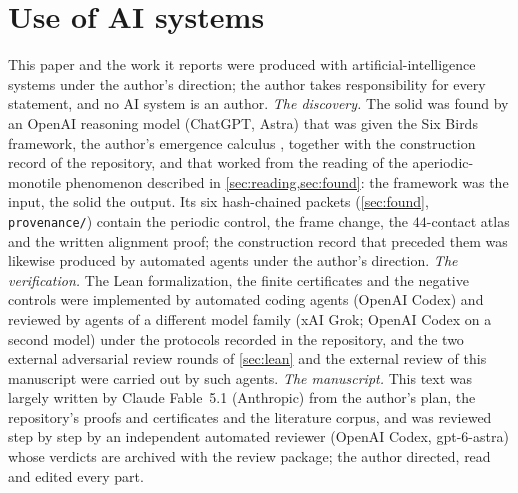 \documentclass[11pt,reqno]{amsart}
\begin{document}
\section*{Use of AI systems}
This paper and the work it reports were produced with artificial-intelligence systems under the
author's direction; the author takes responsibility for every statement, and no AI system is an
author. \emph{The discovery.} The solid was found by an OpenAI reasoning model (ChatGPT, Astra)
that was given the Six Birds framework, the author's emergence calculus
\cite{Tsi26F6,Tsi26F4,Tsi26NDO}, together with the construction record of the repository, and
that worked from the reading of the aperiodic-monotile phenomenon described in
\cref{sec:reading,sec:found}: the framework was the input, the solid the output. Its six
hash-chained packets (\cref{sec:found}, \texttt{provenance/}) contain the periodic control, the
frame change, the $44$-contact atlas and the written alignment proof; the construction record that
preceded them was likewise produced by automated agents under the author's direction. \emph{The
verification.} The Lean formalization, the finite certificates and the negative controls were
implemented by automated coding agents (OpenAI Codex) and reviewed by agents of a different
model family (xAI Grok; OpenAI Codex on a second model) under the protocols recorded in the
repository, and the two external adversarial review rounds of \cref{sec:lean} and the external
review of this manuscript were carried out by such agents. \emph{The manuscript.} This text was largely written by Claude Fable~5.1
(Anthropic) from the author's plan, the repository's proofs and certificates and the literature
corpus, and was reviewed step by step by an independent automated reviewer (OpenAI Codex,
gpt-6-astra) whose verdicts are archived with the review package; the author directed, read and
edited every part.

\appendix





\clearpage

\clearpage



\end{document}

